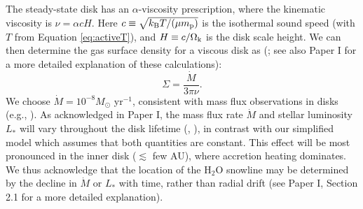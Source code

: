 \documentclass[apj]{emulateapj}
\begin{document}

The steady-state disk has an $\alpha$-viscosity prescription, where the kinematic viscosity is $\nu=\alpha c H$. Here $c \equiv \sqrt{k_{\rm B} T /(\mu m_{\rm p})}$ is the isothermal sound speed (with $T$ from Equation \ref{eq:activeT}), and $H \equiv c/\Omega_{\rm k}$ is the disk scale height. We can then determine the gas surface density for a viscous disk as (\citealt{shakura73}; see also Paper I for a more detailed explanation of these calculations):
\begin{equation}
\label{eq:Sigmaact}
\Sigma=\frac{\dot{M}}{3 \pi \nu}.
\end{equation}
We choose $\dot{M}=10^{-8} M_{\odot}$ yr$^{-1}$, consistent with mass flux observations in disks (e.g., \citealt{andrews10}). As acknowledged in Paper I, the mass flux rate $\dot{M}$ and stellar luminosity $L_*$ will vary throughout the disk lifetime (\citealt{kennedy06}, \citealt{chambers09}), in contrast with our simplified model which assumes that both quantities are constant. This effect will be most pronounced in the inner disk ($\lesssim$ few AU), where accretion heating dominates. We thus acknowledge that the location of the H$_2$O snowline may be determined by the decline in $\dot{M}$ or $L_*$ with time, rather than radial drift (see Paper I, Section 2.1 for a more detailed explanation). 

%
\end{document}
